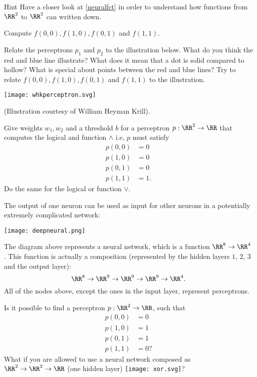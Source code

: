 \documentclass{article}
\begin{document}
\begin{hideinbutton}{Hint}
Have a closer look at \eqref{neuralfct} in order to understand how
functions from $\RR^2$ to $\RR^2$ can written down.
\end{hideinbutton}

Compute
$f(0, 0), f(1, 0), f(0, 1)$ and $f(1, 1)$.



Relate the perceptrons $ p_1 $ and $ p_2 $ to the illustration
below. What do you think the red and blue line illustrate?  What does
it mean that a dot is solid compared to hollow? What is special
about points between the red and blue lines?  Try to relate $f(0,0),
f(1,0), f(0,1)$ and $f(1,1)$ to the illustration.

\texttt{[image: whkperceptron.svg]}

(Illustration courtesy of William Heyman Krill).

\endshex

  \beginshex
  Give weights $w_1, w_2$ and a threshold $b$ for a perceptron $p:\RR^2\rightarrow \RR$ that computes
  the logical and function $\land$ i.e, $p$ must satisfy
  \begin{align*}
    p(0,0) &= 0\\
    p(1, 0) &= 0\\
    p(0,1) &= 0\\
     p(1, 1) &= 1.
  \end{align*}
  Do the same for the logical or function $\lor$.
  \endshex
  
  The output of one neuron can be used as input for other neurons in a potentially extremely complicated network:

  \texttt{[image: deepneural.png]}

  The diagram above represents a neural network, which is a function $\RR^8\rightarrow \RR^4$. This function
  is actually a composition (represented by the hidden layers $1$, $2$, $3$ and the output layer):
  $$
  \RR^8\rightarrow \RR^9 \rightarrow \RR^9 \rightarrow \RR^9 \rightarrow \RR^4.
  $$
  All of the nodes above, except the ones in the input layer, represent perceptrons.

  \beginshex 
  Is it possible to find a perceptron $p:\RR^2\rightarrow \RR$, such that
    \begin{align*}
    p(0,0) &= 0\\
    p(1, 0) &= 1\\
    p(0,1) &= 1\\
     p(1, 1) &= 0?
  \end{align*}
  What if you are allowed to use a neural network composed as $\RR^2\rightarrow \RR^2\rightarrow \RR$ (one hidden layer)
  \texttt{[image: xor.svg]}?
  \endshex
  
\end{document}
